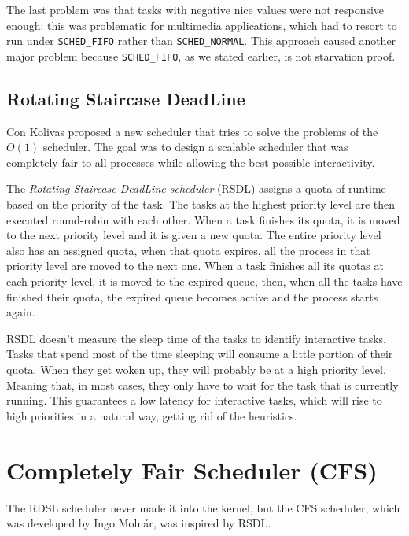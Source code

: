 The last problem was that tasks with negative nice values were not responsive enough: this was problematic for multimedia applications, which had to resort to run under \verb|SCHED_FIFO| rather than \verb|SCHED_NORMAL|. This approach caused another major problem because \verb|SCHED_FIFO|, as we stated earlier, is not starvation proof.

\subsection{Rotating Staircase DeadLine}
Con Kolivas proposed a new scheduler that tries to solve the problems of the $O(1)$ scheduler. The goal was to design a scalable scheduler that was completely fair to all processes while allowing the best possible interactivity.\cite{con}

The \textit{Rotating Staircase DeadLine scheduler} (RSDL) assigns a quota of
runtime based on the priority of the task. The tasks at the highest
priority level are then executed round-robin with each other. When a
task finishes its quota, it is moved to the next priority level and it
is given a new quota. The entire priority level also has an assigned
quota, when that quota expires, all the process in that priority level
are moved to the next one. When a task finishes all its quotas at each
priority level, it is moved to the expired queue, then, when all the tasks
have finished their quota, the expired queue becomes active and the
process starts again.

RSDL doesn't measure the sleep time of the tasks to identify interactive tasks. Tasks that spend most of the time sleeping will consume a little portion of their quota. When they get woken up, they will probably be at a high priority level. Meaning that, in most cases, they only have to wait for the task that is currently running. This guarantees a low latency for interactive tasks, which will rise to high priorities in a natural way, getting rid of the heuristics. 

\section{Completely Fair Scheduler (CFS)}
The RDSL scheduler never made it into the kernel, but the CFS scheduler, which was developed by Ingo Moln\'ar\cite{ingo}, was inspired by RSDL.

